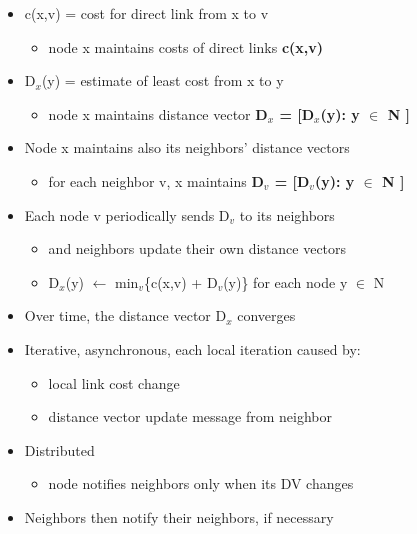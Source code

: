 \documentclass[../resumosRCOM.tex]{subfiles}
\begin{document}
\begin{itemize}
    \item c(x,v) = cost for direct link from x to v
    \begin{itemize}
        \item node x maintains costs of direct links \textbf{c(x,v)}
    \end{itemize}
    \item D$_x$(y) = estimate of least cost from x to y
    \begin{itemize}
        \item node x maintains distance vector \textbf{D$_x$ = [D$_x$(y): y $\in$ N ]}
    \end{itemize}
    \item Node x maintains also its neighbors’ distance vectors
    \begin{itemize}
        \item for each neighbor v, x maintains \textbf{D$_v$ = [D$_v$(y): y $\in$ N ]}
    \end{itemize}
    \item Each node v periodically sends D$_v$ to its neighbors
    \begin{itemize}
        \item and neighbors update their own distance vectors
        \item D$_x$(y) $\leftarrow$ min$_v$\{c(x,v) + D$_v$(y)\} for each node y $\in$ N
    \end{itemize}
    \item Over time, the distance vector D$_x$ converges
\end{itemize}

\begin{itemize}
    \item Iterative, asynchronous, each local iteration caused by:
    \begin{itemize}
        \item local link cost change 
        \item distance vector update message from neighbor
    \end{itemize}
    \item Distributed
    \begin{itemize}
        \item node notifies neighbors only when its DV changes
    \end{itemize}
    \item Neighbors then notify their neighbors, if necessary
\end{itemize}
\end{document}
